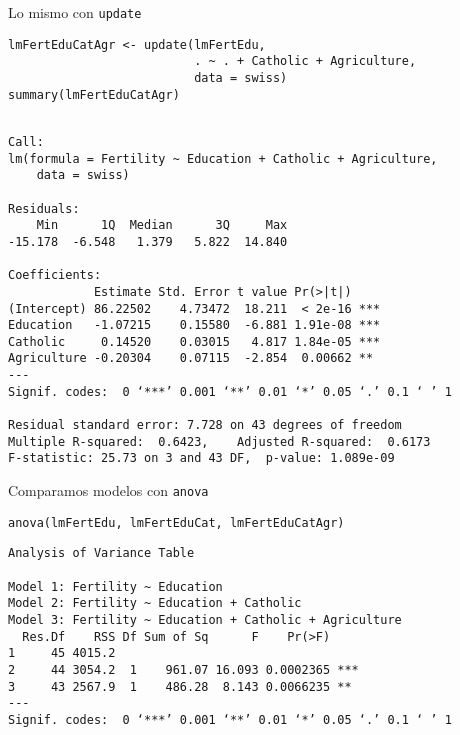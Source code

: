 \documentclass[xcolor={usenames,svgnames,dvipsnames}]{beamer}
\begin{document}
\begin{frame}[fragile,label={sec:org2c31c07}]{Lo mismo con \texttt{update}}
 \lstset{language=r,label= ,caption= ,captionpos=b,numbers=none}
\begin{lstlisting}
lmFertEduCatAgr <- update(lmFertEdu,
                          . ~ . + Catholic + Agriculture,
                          data = swiss)
summary(lmFertEduCatAgr)
\end{lstlisting}

\begin{verbatim}

Call:
lm(formula = Fertility ~ Education + Catholic + Agriculture, 
    data = swiss)

Residuals:
    Min      1Q  Median      3Q     Max 
-15.178  -6.548   1.379   5.822  14.840 

Coefficients:
            Estimate Std. Error t value Pr(>|t|)    
(Intercept) 86.22502    4.73472  18.211  < 2e-16 ***
Education   -1.07215    0.15580  -6.881 1.91e-08 ***
Catholic     0.14520    0.03015   4.817 1.84e-05 ***
Agriculture -0.20304    0.07115  -2.854  0.00662 ** 
---
Signif. codes:  0 ‘***’ 0.001 ‘**’ 0.01 ‘*’ 0.05 ‘.’ 0.1 ‘ ’ 1

Residual standard error: 7.728 on 43 degrees of freedom
Multiple R-squared:  0.6423,	Adjusted R-squared:  0.6173 
F-statistic: 25.73 on 3 and 43 DF,  p-value: 1.089e-09
\end{verbatim}
\end{frame}

\begin{frame}[fragile,label={sec:orge271e5b}]{Comparamos modelos con \texttt{anova}}
 \lstset{language=r,label= ,caption= ,captionpos=b,numbers=none}
\begin{lstlisting}
anova(lmFertEdu, lmFertEduCat, lmFertEduCatAgr)
\end{lstlisting}

\begin{verbatim}
Analysis of Variance Table

Model 1: Fertility ~ Education
Model 2: Fertility ~ Education + Catholic
Model 3: Fertility ~ Education + Catholic + Agriculture
  Res.Df    RSS Df Sum of Sq      F    Pr(>F)    
1     45 4015.2                                  
2     44 3054.2  1    961.07 16.093 0.0002365 ***
3     43 2567.9  1    486.28  8.143 0.0066235 ** 
---
Signif. codes:  0 ‘***’ 0.001 ‘**’ 0.01 ‘*’ 0.05 ‘.’ 0.1 ‘ ’ 1
\end{verbatim}
\end{frame}
\end{document}
